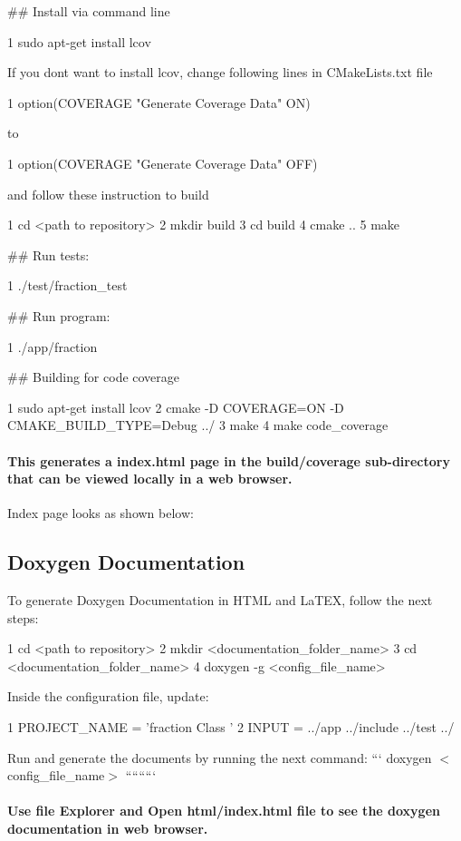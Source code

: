 \#\# Install via command line 
\begin{DoxyCode}
1 sudo apt-get install lcov
\end{DoxyCode}
 If you dont want to install lcov, change following lines in \textquotesingle{}C\+Make\+Lists.\+txt\textquotesingle{} file 
\begin{DoxyCode}
1 option(COVERAGE "Generate Coverage Data" ON)
\end{DoxyCode}
 to 
\begin{DoxyCode}
1 option(COVERAGE "Generate Coverage Data" OFF)
\end{DoxyCode}
 and follow these instruction to build 
\begin{DoxyCode}
1 cd <path to repository>
2 mkdir build
3 cd build
4 cmake ..
5 make
\end{DoxyCode}
 \#\# Run tests\+: 
\begin{DoxyCode}
1 ./test/fraction\_test
\end{DoxyCode}
 \#\# Run program\+: 
\begin{DoxyCode}
1 ./app/fraction 
\end{DoxyCode}
 \#\# Building for code coverage 
\begin{DoxyCode}
1 sudo apt-get install lcov
2 cmake -D COVERAGE=ON -D CMAKE\_BUILD\_TYPE=Debug ../
3 make
4 make code\_coverage
\end{DoxyCode}
 \paragraph*{This generates a index.\+html page in the build/coverage sub-\/directory that can be viewed locally in a web browser.}

Index page looks as shown below\+:

 \subsection*{Doxygen Documentation}

To generate Doxygen Documentation in H\+T\+ML and La\+T\+EX, follow the next steps\+: 
\begin{DoxyCode}
1 cd <path to repository>
2 mkdir <documentation\_folder\_name>
3 cd <documentation\_folder\_name>
4 doxygen -g <config\_file\_name>
\end{DoxyCode}
 Inside the configuration file, update\+: 
\begin{DoxyCode}
1 PROJECT\_NAME = 'fraction Class '
2 INPUT = ../app ../include ../test ../
\end{DoxyCode}
 Run and generate the documents by running the next command\+: ``` doxygen $<$config\+\_\+file\+\_\+name$>$ ````````` \paragraph*{Use file Explorer and Open html/index.\+html file to see the doxygen documentation in web browser.}

